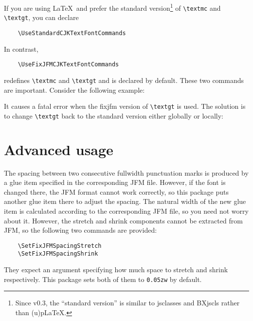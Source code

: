 \documentclass[a4paper]{article}
\newcommand\NormalSans{\normalfont\sffamily}
\newcommand\pkg[1]{{\protect\NormalSans#1}}
\newcommand\pLaTeX{p\LaTeX}
\newcommand\FwBox{\ensuremath{\square}\hskip0em plus 0.05em\relax}
\newcommand\TwoFwBoxes{\FwBox\FwBox}
\begin{document}
If you are using \LaTeX\ and prefer the standard version\footnote{Since v0.3,
the ``standard version'' is similar to \pkg{jsclasses} and \pkg{BXjscls} rather
than (u)\pLaTeX.} of \verb|\textmc| and \verb|\textgt|, you can declare
\begin{verbatim}
    \UseStandardCJKTextFontCommands
\end{verbatim}
In contrast,
\begin{verbatim}
    \UseFixJFMCJKTextFontCommands
\end{verbatim}
redefines \verb|\textmc| and \verb|\textgt| and is declared by default. These
two commands are important. Consider the following example:
\begin{trivlist}
\item\relax{\ttfamily\hskip2em}\verb|\textgt{\Large |\TwoFwBoxes\verb|}|
\end{trivlist}
It causes a fatal error when the \pkg{fixjfm} version of \verb|\textgt| is used.
The solution is to change \verb|\textgt| back to the standard version either
globally or locally:
\begin{trivlist}\itemsep=0pt\relax\parsep=0pt\relax
\item\relax{\ttfamily\hskip2em}%
\verb|\UseFixJFMCJKTextFontCommands   \textgt{|\TwoFwBoxes\verb|}|
\item\relax{\ttfamily\hskip2em}%
\verb|\UseStandardCJKTextFontCommands \textgt{\Large |\TwoFwBoxes\verb|}|
\item\relax{\ttfamily\hskip2em}%
\verb|\UseFixJFMCJKTextFontCommands   \textgt{|\TwoFwBoxes\verb|}|
\item\relax{\ttfamily\hskip1.5em}%
\verb|{\UseStandardCJKTextFontCommands \textgt{\Large |\TwoFwBoxes\verb|}}|
\end{trivlist}

\section{Advanced usage}

The spacing between two consecutive fullwidth punctuation marks is produced by
a glue item specified in the corresponding JFM file. However, if the font is
changed there, the JFM format cannot work correctly, so this package puts
another glue item there to adjust the spacing. The natural width of the new glue
item is calculated according to the corresponding JFM file, so you need not
worry about it. However, the stretch and shrink components cannot be extracted
from JFM, so the following two commands are provided:
\begin{verbatim}
    \SetFixJFMSpacingStretch
    \SetFixJFMSpacingShrink
\end{verbatim}
They expect an argument specifying how much space to stretch and shrink
respectively. This package sets both of them to \verb|0.05zw| by default.
\end{document}

